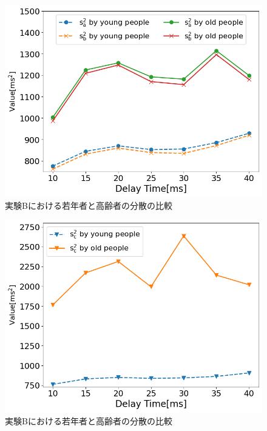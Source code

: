\begin{figure}[tbp]
  \centering
  \includegraphics[scale=0.5]{figures/Honbann/Comparison_young_old/Var_40ms_Sa_Sb.png}
  \caption{実験Bにおける若年者と高齢者の分散の比較}
  \label{fig:Var_40ms_Sa_Sb}
\end{figure}

\begin{figure}[tbp]
  \centering
  \includegraphics[scale=0.5]{figures/Honbann/Comparison_young_old/Var_40ms_Sc.png}
  \caption{実験Bにおける若年者と高齢者の分散の比較}
  \label{fig:Var_40ms_Sc}
\end{figure}

